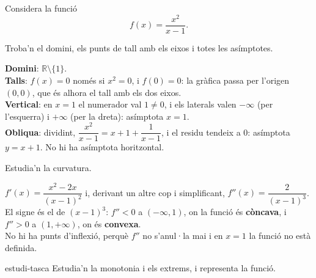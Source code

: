 Considera la funció
\[
f(x)=\frac{x^2}{x-1} .
\]

\begin{apartats}

Troba'n el domini, els punts de tall amb els eixos i totes les asímptotes.

\begin{solucio}
\textbf{Domini}: $\mathbb{R}\setminus\{1\}$.\\
\textbf{Talls}: $f(x)=0$ només si $x^2=0$, i $f(0)=0$: la gràfica passa per l'origen
$(0,0)$, que és alhora el tall amb els dos eixos.\\
\textbf{Vertical}: en $x=1$ el numerador val $1\neq0$, i els laterals valen $-\infty$ (per
l'esquerra) i $+\infty$ (per la dreta): asímptota $\boxed{x=1}$.\\
\textbf{Obliqua}: dividint, $\dfrac{x^2}{x-1}=x+1+\dfrac{1}{x-1}$, i el residu tendeix a $0$:
asímptota $\boxed{y=x+1}$. No hi ha asímptota horitzontal.
\end{solucio}

\begin{nomesllarg}
Estudia'n la curvatura.

\begin{solucio}
$f'(x)=\dfrac{x^2-2x}{(x-1)^2}$ i, derivant un altre cop i simplificant,
$f''(x)=\dfrac{2}{(x-1)^3}$.\\
El signe és el de $(x-1)^3$: $f''<0$ a $(-\infty,1)$, on la funció és \textbf{còncava}, i
$f''>0$ a $(1,+\infty)$, on és \textbf{convexa}.\\
No hi ha punts d'inflexió, perquè $f''$ no s'anul·la mai i en $x=1$ la funció no està
definida.
\end{solucio}
\end{nomesllarg}

\begin{tria}{estudi-tasca}
Estudia'n la monotonia i els extrems, i representa la funció.


\end{tria}
\end{apartats}
